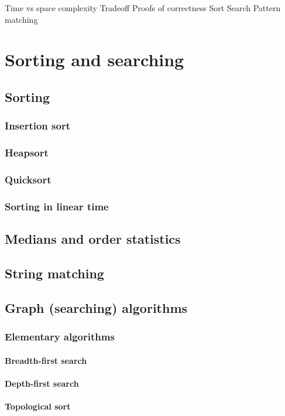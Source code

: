 Time vs space complexity
Tradeoff
Proofs of correctness
Sort
Search
Pattern matching

\chapter{Sorting and searching}
\section{Sorting}
\subsection{Insertion sort}
\subsection{Heapsort}
\subsection{Quicksort}
\subsection{Sorting in linear time}
\section{Medians and order statistics}
\section{String matching}
\section{Graph (searching) algorithms}
\subsection{Elementary algorithms}
\subsubsection{Breadth-first search}
\subsubsection{Depth-first search}
\subsubsection{Topological sort}
